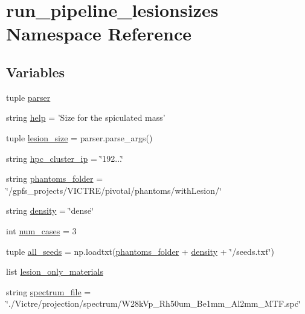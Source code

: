 \hypertarget{namespacerun__pipeline__lesionsizes}{\section{run\-\_\-pipeline\-\_\-lesionsizes Namespace Reference}
\label{namespacerun__pipeline__lesionsizes}
}
\subsection*{Variables}
\begin{DoxyCompactItemize}
\item 
tuple \hyperlink{namespacerun__pipeline__lesionsizes_a275196213a52b483bde36a8d8b8535cb}{parser}
\item 
string \hyperlink{namespacerun__pipeline__lesionsizes_aa88ad88d9cf23592a308b4d4e2ed6ebf}{help} = 'Size for the spiculated mass'
\item 
tuple \hyperlink{namespacerun__pipeline__lesionsizes_ae091ae8eef37ab6c53b0409575d19343}{lesion\-\_\-size} = parser.\-parse\-\_\-args()
\item 
string \hyperlink{namespacerun__pipeline__lesionsizes_a459355f58091ae51752cbc1b81939a7d}{hpc\-\_\-cluster\-\_\-ip} = \char`\"{}192...\char`\"{}
\item 
string \hyperlink{namespacerun__pipeline__lesionsizes_a121e580b0ae55595847533bd0f4c9250}{phantoms\-\_\-folder} = \char`\"{}/gpfs\-\_\-projects/V\-I\-C\-T\-R\-E/pivotal/phantoms/with\-Lesion/\char`\"{}
\item 
string \hyperlink{namespacerun__pipeline__lesionsizes_ae2a3f1b39ec7dc28c3aa3bc223432ba8}{density} = \char`\"{}dense\char`\"{}
\item 
int \hyperlink{namespacerun__pipeline__lesionsizes_a23bb2caa24e95d5ce8622ae343b0035f}{num\-\_\-cases} = 3
\item 
tuple \hyperlink{namespacerun__pipeline__lesionsizes_a17e351f66c99883c1fc46e398ddb89db}{all\-\_\-seeds} = np.\-loadtxt(\hyperlink{namespacerun__pipeline__lesionsizes_a121e580b0ae55595847533bd0f4c9250}{phantoms\-\_\-folder} + \hyperlink{namespacerun__pipeline__lesionsizes_ae2a3f1b39ec7dc28c3aa3bc223432ba8}{density} + \char`\"{}/seeds.\-txt\char`\"{})
\item 
list \hyperlink{namespacerun__pipeline__lesionsizes_aba8698213c56a7ecc0806eb68c010d63}{lesion\-\_\-only\-\_\-materials}
\item 
string \hyperlink{namespacerun__pipeline__lesionsizes_aa2e480913d7171fd2b0c89520bcec773}{spectrum\-\_\-file} = \char`\"{}./Victre/projection/spectrum/W28k\-Vp\-\_\-\-Rh50um\-\_\-\-Be1mm\-\_\-\-Al2mm\-\_\-\-M\-T\-F.\-spc\char`\"{}

\end{DoxyCompactItemize}
